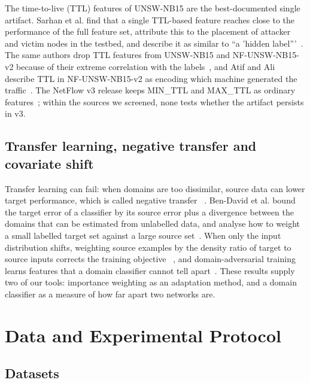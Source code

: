 \documentclass[11pt]{article}
\begin{document}
The time-to-live (TTL) features of UNSW-NB15 are the best-documented single artifact. Sarhan et al. find that a single TTL-based feature reaches close to the performance of the full feature set, attribute this to the placement of attacker and victim nodes in the testbed, and describe it as similar to ``a 'hidden label'''~\cite{sarhan2021featureanalysis}. The same authors drop TTL features from UNSW-NB15 and NF-UNSW-NB15-v2 because of their extreme correlation with the labels~\cite{sarhan2022standard}, and Atif and Ali describe TTL in NF-UNSW-NB15-v2 as encoding which machine generated the traffic~\cite{atif2026threeaxis}. The NetFlow v3 release keeps MIN\_TTL and MAX\_TTL as ordinary features~\cite{luay2025temporal}; within the sources we screened, none tests whether the artifact persists in v3.

\subsection{Transfer learning, negative transfer and covariate shift}

Transfer learning can fail: when domains are too dissimilar, source data can lower target performance, which is called negative transfer ~\cite{pan2010survey,zhang2023negative}. Ben-David et al. bound the target error of a classifier by its source error plus a divergence between the domains that can be estimated from unlabelled data, and analyse how to weight a small labelled target set against a large source set~\cite{bendavid2010theory}. When only the input distribution shifts, weighting source examples by the density ratio of target to source inputs corrects the training objective ~\cite{shimodaira2000improving,sugiyama2007covariate}, and domain-adversarial training learns features that a domain classifier cannot tell apart~\cite{ganin2016domain}. These results supply two of our tools: importance weighting as an adaptation method, and a domain classifier as a measure of how far apart two networks are.

\section{Data and Experimental Protocol}

\subsection{Datasets}
\end{document}
